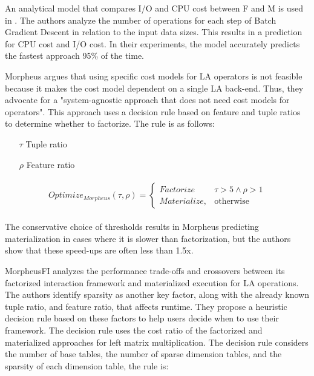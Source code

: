 An analytical model that compares I/O and CPU cost between F and M is used in \cite{orion_learning_gen_lin_models}. The authors analyze the number of operations for each step of Batch Gradient Descent in relation to the input data sizes. This results in a prediction for CPU cost and I/O cost. In their experiments, the model accurately predicts the fastest approach 95\% of the time.


Morpheus \cite{morpheus} argues that using specific cost models for LA operators is not feasible because it makes the cost model dependent on a single LA back-end. Thus, they advocate for a "system-agnostic approach that does not need cost models for operators". This approach uses a decision rule based on feature and tuple ratios to determine whether to factorize. The rule is as follows:

\begin{definition}

	\begin{itemize}
		\item[]
		\item[$\tau$] Tuple ratio
		\item[$\rho$] Feature ratio
	\end{itemize}
	\small{
		\begin{align*}
			\begin{split}
				Optimize_{Morpheus}(\tau, \rho) =  \begin{cases}Factorize & \tau > 5 \wedge \rho > 1
             \\Materialize, & \text{otherwise}\end{cases}
			\end{split}
		\end{align*}
	}
\end{definition}
The conservative choice of thresholds results in Morpheus predicting materialization in cases where it is slower than factorization, but the authors show that these speed-ups are often less than 1.5x.

MorpheusFI \cite{MorpheusFIEnablingOptimizingNonlinear2019} analyzes the performance trade-offs and crossovers between its factorized interaction framework and materialized execution for LA operations. The authors identify sparsity as another key factor, along with the already known tuple ratio, and feature ratio, that affects runtime. They propose a heuristic decision rule based on these factors to help users decide when to use their framework. The decision rule uses the cost ratio of the factorized and materialized approaches for left matrix multiplication. The decision rule considers the number of base tables, the number of sparse dimension tables, and the sparsity of each dimension table, the rule is:

